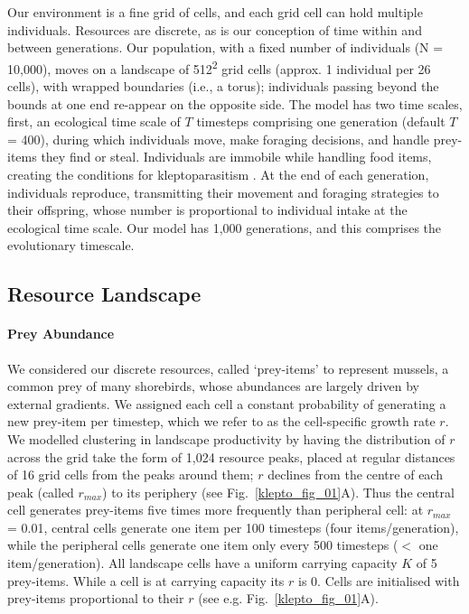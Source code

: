 Our environment is a fine grid of cells, and each grid cell can hold multiple individuals.
Resources are discrete, as is our conception of time within and between generations. 
Our population, with a fixed number of individuals (N = 10,000), moves on a landscape of 512\textsuperscript{2} grid cells (approx. 1 individual per 26 cells), with wrapped boundaries (i.e., a torus); individuals passing beyond the bounds at one end re-appear on the opposite side.
The model has two time scales, first, an ecological time scale of $T$ timesteps comprising one generation (default $T$ = 400), during which individuals move, make foraging decisions, and handle prey-items they find or steal.
Individuals are immobile while handling food items, creating the conditions for kleptoparasitism \citep{brockmann1979,ruxton1992}.
At the end of each generation, individuals reproduce, transmitting their movement and foraging strategies to their offspring, whose number is proportional to individual intake at the ecological time scale.
Our model has 1,000 generations, and this comprises the evolutionary timescale.

\subsection*{Resource Landscape}

\paragraph{Prey Abundance}

We considered our discrete resources, called `prey-items' to represent mussels, a common prey of many shorebirds, whose abundances are largely driven by external gradients.
We assigned each cell a constant probability of generating a new prey-item per timestep, which we refer to as the cell-specific growth rate $r$.
We modelled clustering in landscape productivity by having the distribution of $r$ across the grid take the form of 1,024 resource peaks, placed at regular distances of 16 grid cells from the peaks around them; $r$ declines from the centre of each peak (called $r_{max}$) to its periphery (see Fig.~\ref{klepto_fig_01}A).
Thus the central cell generates prey-items five times more frequently than peripheral cell: at $r_{max}$ = 0.01, central cells generate one item per 100 timesteps (four items/generation), while the peripheral cells generate one item only every 500 timesteps ($<$ one item/generation).
All landscape cells have a uniform carrying capacity $K$ of 5 prey-items.
While a cell is at carrying capacity its $r$ is 0.
Cells are initialised with prey-items proportional to their $r$ (see e.g. Fig.~\ref{klepto_fig_01}A).


